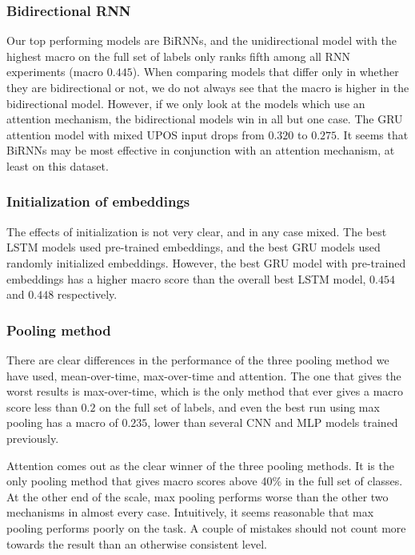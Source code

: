 \subsubsection{Bidirectional RNN}

Our top performing models are BiRNNs, and the unidirectional model with the
highest macro \FI on the full set of labels only ranks fifth among all RNN
experiments (macro \FI $0.445$). When comparing models that differ only in
whether they are bidirectional or not, we do not always see that the macro
\FI is higher in the bidirectional model. However, if we only look at the
models which use an attention mechanism, the bidirectional models win in all
but one case. The GRU attention model with mixed UPOS input drops from
$0.320$ to $0.275$. It seems that BiRNNs may be most effective in conjunction
with an attention mechanism, at least on this dataset.


\subsubsection{Initialization of embeddings}

The effects of initialization is not very clear, and in any case mixed. The
best LSTM models used pre-trained embeddings, and the best GRU models used
randomly initialized embeddings. However, the best GRU model with pre-trained
embeddings has a higher macro \FI score than the overall best LSTM model,
$0.454$ and $0.448$ respectively.


\subsubsection{Pooling method}

There are clear differences in the performance of the three pooling method we
have used, mean-over-time, max-over-time and attention. The one that gives
the worst results is max-over-time, which is the only method that ever gives
a macro \FI score less than $0.2$ on the full set of labels, and even the
best run using max pooling has a macro \FI of $0.235$, lower than several CNN
and MLP models trained previously.

Attention comes out as the clear winner of the three pooling methods. It is
the only pooling method that gives macro \FI scores above 40\% in the full
set of classes. At the other end of the scale, max pooling performs worse
than the other two mechanisms in almost every case. Intuitively, it seems
reasonable that max pooling performs poorly on the task. A couple of mistakes
should not count more towards the result than an otherwise consistent level.

